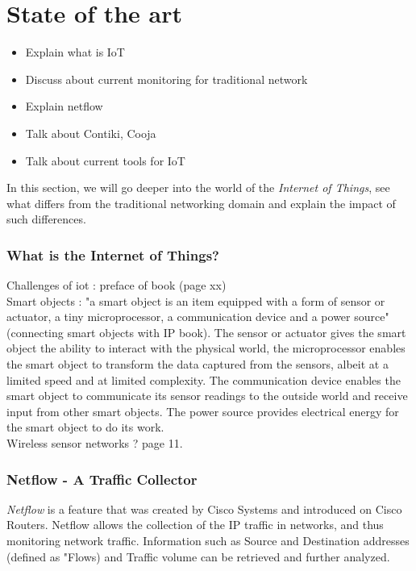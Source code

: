 \chapter{State of the art}

\begin{itemize}
	\item Explain what is IoT
	\item Discuss about current monitoring for traditional network
	\item Explain netflow
	\item Talk about Contiki, Cooja
	\item Talk about current tools for IoT
\end{itemize}

In this section, we will go deeper into the world of the \textit{Internet of Things}, see what differs from the traditional networking domain and explain the impact of such differences. \\

\subsection{What is the Internet of Things?}
Challenges of iot : preface of book (page xx)\\

Smart objects : "a smart object is an item equipped with a form of sensor or actuator, a tiny microprocessor, a communication device and a power source"(connecting smart objects with IP book). The sensor or actuator gives the smart object the ability to interact with the physical world, the microprocessor enables the smart object to transform the data captured from the sensors, albeit at a limited speed and at limited complexity. The communication device enables the smart object to communicate its sensor readings to the outside world and receive input from other smart objects. The power source provides electrical energy for the smart object to do its work. \\

Wireless sensor networks ? page 11. 

\subsection{Netflow - A Traffic Collector}
\textit{Netflow} is a feature that was created by Cisco Systems and introduced on Cisco Routers. Netflow allows the collection of the IP traffic in networks, and thus monitoring network traffic. Information such as Source and Destination addresses (defined as "Flows) and Traffic volume can be retrieved and further analyzed.\\

